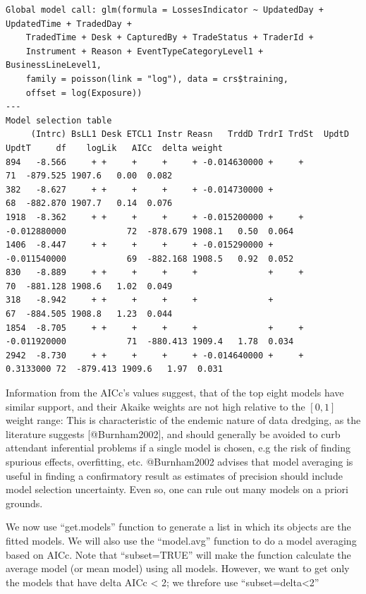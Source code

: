 \documentclass[]{article}
\begin{document}
\singlespacing
\begin{verbatim}
Global model call: glm(formula = LossesIndicator ~ UpdatedDay + UpdatedTime + TradedDay + 
    TradedTime + Desk + CapturedBy + TradeStatus + TraderId + 
    Instrument + Reason + EventTypeCategoryLevel1 + BusinessLineLevel1, 
    family = poisson(link = "log"), data = crs$training, 
    offset = log(Exposure))
---
Model selection table 
     (Intrc) BsLL1 Desk ETCL1 Instr Reasn   TrddD TrdrI TrdSt  UpdtD      UpdtT     df    logLik   AICc  delta weight
894   -8.566     + +     +     +     + -0.014630000 +     +                         71  -879.525 1907.6   0.00  0.082
382   -8.627     + +     +     +     + -0.014730000 +                               68  -882.870 1907.7   0.14  0.076
1918  -8.362     + +     +     +     + -0.015200000 +     + -0.012880000            72  -878.679 1908.1   0.50  0.064
1406  -8.447     + +     +     +     + -0.015290000 +       -0.011540000            69  -882.168 1908.5   0.92  0.052
830   -8.889     + +     +     +     +              +     +                         70  -881.128 1908.6   1.02  0.049
318   -8.942     + +     +     +     +              +                               67  -884.505 1908.8   1.23  0.044
1854  -8.705     + +     +     +     +              +     + -0.011920000            71  -880.413 1909.4   1.78  0.034
2942  -8.730     + +     +     +     + -0.014640000 +     +               0.3133000 72  -879.413 1909.6   1.97  0.031

\end{verbatim}
\doublespacing

Information from the AICc's values suggest, that of the top eight models
have similar support, and their Akaike weights are not high relative to
the \([0,1]\) weight range: This is characteristic of the endemic nature
of data dredging, as the literature suggests {[}@Burnham2002{]}, and
should generally be avoided to curb attendant inferential problems if a
single model is chosen, e.g the risk of finding spurious effects,
overfitting, etc. @Burnham2002 advises that model averaging is useful in
finding a confirmatory result as estimates of precision should include
model selection uncertainty. Even so, one can rule out many models on a
priori grounds.\medskip    

We now use ``get.models'' function to generate a list in which its
objects are the fitted models. We will also use the ``model.avg''
function to do a model averaging based on AICc. Note that
``subset=TRUE'' will make the function calculate the average model (or
mean model) using all models. However, we want to get only the models
that have delta AICc \textless{} 2; we threfore use
``subset=delta\textless{}2''
\end{document}
